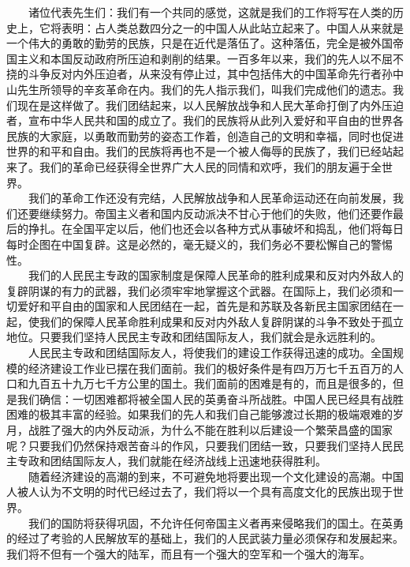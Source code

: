 \documentclass[cn,11pt,chinese]{elegantbook}
\begin{document}
　　诸位代表先生们：我们有一个共同的感觉，这就是我们的工作将写在人类的历史上，它将表明：占人类总数四分之一的中国人从此站立起来了。中国人从来就是一个伟大的勇敢的勤劳的民族，只是在近代是落伍了。这种落伍，完全是被外国帝国主义和本国反动政府所压迫和剥削的结果。一百多年以来，我们的先人以不屈不挠的斗争反对内外压迫者，从来没有停止过，其中包括伟大的中国革命先行者孙中山先生所领导的辛亥革命在内。我们的先人指示我们，叫我们完成他们的遗志。我们现在是这样做了。我们团结起来，以人民解放战争和人民大革命打倒了内外压迫者，宣布中华人民共和国的成立了。我们的民族将从此列入爱好和平自由的世界各民族的大家庭，以勇敢而勤劳的姿态工作着，创造自己的文明和幸福，同时也促进世界的和平和自由。我们的民族将再也不是一个被人侮辱的民族了，我们已经站起来了。我们的革命已经获得全世界广大人民的同情和欢呼，我们的朋友遍于全世界。\\
　　我们的革命工作还没有完结，人民解放战争和人民革命运动还在向前发展，我们还要继续努力。帝国主义者和国内反动派决不甘心于他们的失败，他们还要作最后的挣扎。在全国平定以后，他们也还会以各种方式从事破坏和捣乱，他们将每日每时企图在中国复辟。这是必然的，毫无疑义的，我们务必不要松懈自己的警惕性。\\
　　我们的人民民主专政的国家制度是保障人民革命的胜利成果和反对内外敌人的复辟阴谋的有力的武器，我们必须牢牢地掌握这个武器。在国际上，我们必须和一切爱好和平自由的国家和人民团结在一起，首先是和苏联及各新民主国家团结在一起，使我们的保障人民革命胜利成果和反对内外敌人复辟阴谋的斗争不致处于孤立地位。只要我们坚持人民民主专政和团结国际友人，我们就会是永远胜利的。\\
　　人民民主专政和团结国际友人，将使我们的建设工作获得迅速的成功。全国规模的经济建设工作业已摆在我们面前。我们的极好条件是有四万万七千五百万的人口和九百五十九万七千方公里的国土。我们面前的困难是有的，而且是很多的，但是我们确信：一切困难都将被全国人民的英勇奋斗所战胜。中国人民已经具有战胜困难的极其丰富的经验。如果我们的先人和我们自己能够渡过长期的极端艰难的岁月，战胜了强大的内外反动派，为什么不能在胜利以后建设一个繁荣昌盛的国家呢？只要我们仍然保持艰苦奋斗的作风，只要我们团结一致，只要我们坚持人民民主专政和团结国际友人，我们就能在经济战线上迅速地获得胜利。\\
　　随着经济建设的高潮的到来，不可避免地将要出现一个文化建设的高潮。中国人被人认为不文明的时代已经过去了，我们将以一个具有高度文化的民族出现于世界。\\
　　我们的国防将获得巩固，不允许任何帝国主义者再来侵略我们的国土。在英勇的经过了考验的人民解放军的基础上，我们的人民武装力量必须保存和发展起来。我们将不但有一个强大的陆军，而且有一个强大的空军和一个强大的海军。\\
\end{document}
